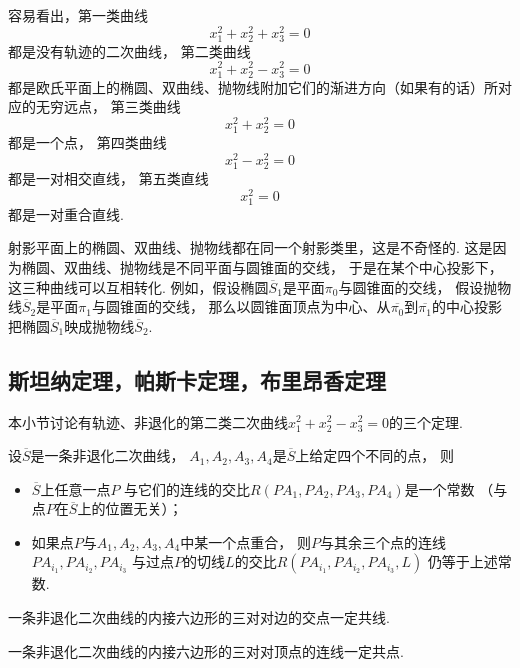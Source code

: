 容易看出，第一类曲线\begin{equation*}
	x_1^2 + x_2^2 + x_3^2 = 0
\end{equation*}
都是没有轨迹的二次曲线，
第二类曲线\begin{equation*}
	x_1^2 + x_2^2 - x_3^2 = 0
\end{equation*}
都是欧氏平面上的椭圆、双曲线、抛物线附加它们的渐进方向（如果有的话）所对应的无穷远点，
第三类曲线\begin{equation*}
	x_1^2 + x_2^2 = 0
\end{equation*}
都是一个点，
第四类曲线\begin{equation*}
	x_1^2 - x_2^2 = 0
\end{equation*}
都是一对相交直线，
第五类直线\begin{equation*}
	x_1^2 = 0
\end{equation*}
都是一对重合直线.

射影平面上的椭圆、双曲线、抛物线都在同一个射影类里，这是不奇怪的.
这是因为椭圆、双曲线、抛物线是不同平面与圆锥面的交线，
于是在某个中心投影下，这三种曲线可以互相转化.
例如，假设椭圆\(\overline{S}_1\)是平面\(\pi_0\)与圆锥面的交线，
假设抛物线\(\overline{S}_2\)是平面\(\pi_1\)与圆锥面的交线，
那么以圆锥面顶点为中心、从\(\overline{\pi_0}\)到\(\overline{\pi_1}\)的中心投影
把椭圆\(\overline{S}_1\)映成抛物线\(\overline{S}_2\).

\subsection{斯坦纳定理，帕斯卡定理，布里昂香定理}
本小节讨论有轨迹、非退化的第二类二次曲线\(
	x_1^2 + x_2^2 - x_3^2 = 0
\)的三个定理.

\begin{theorem}
设\(\overline{S}\)是一条非退化二次曲线，
\(A_1,A_2,A_3,A_4\)是\(\overline{S}\)上给定四个不同的点，
则\begin{itemize}
	\item \(\overline{S}\)上任意一点\(P\)
	与它们的连线的交比\(R(PA_1,PA_2,PA_3,PA_4)\)是一个常数
	（与点\(P\)在\(\overline{S}\)上的位置无关）；

	\item 如果点\(P\)与\(A_1,A_2,A_3,A_4\)中某一个点重合，
	则\(P\)与其余三个点的连线\(PA_{i_1},PA_{i_2},PA_{i_3}\)
	与过点\(P\)的切线\(L\)的交比\(R(PA_{i_1},PA_{i_2},PA_{i_3},L)\)
	仍等于上述常数.
\end{itemize}
\end{theorem}

\begin{theorem}
一条非退化二次曲线的内接六边形的三对对边的交点一定共线.
\end{theorem}

\begin{theorem}
一条非退化二次曲线的内接六边形的三对对顶点的连线一定共点.
\end{theorem}
